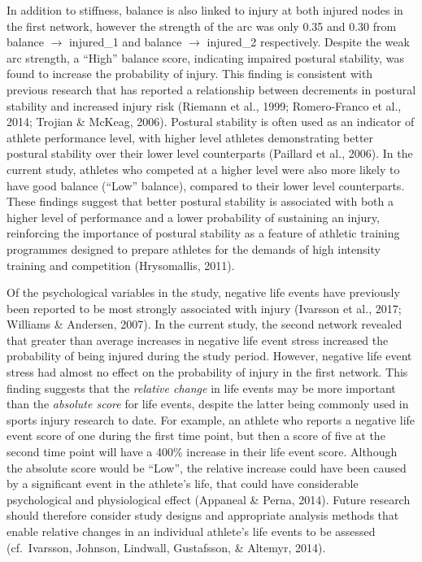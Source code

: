 \documentclass[
  english,
  man,floatsintext]{apa6}
\begin{document}
In addition to stiffness, balance is also linked to injury at both injured nodes in the first network, however the strength of the arc was only 0.35 and 0.30 from balance \(\rightarrow\) injured\_1 and balance \(\rightarrow\) injured\_2 respectively.
Despite the weak arc strength, a \enquote{High} balance score, indicating impaired postural stability, was found to increase the probability of injury.
This finding is consistent with previous research that has reported a relationship between decrements in postural stability and increased injury risk (Riemann et al., 1999; Romero-Franco et al., 2014; Trojian \& McKeag, 2006).
Postural stability is often used as an indicator of athlete performance level, with higher level athletes demonstrating better postural stability over their lower level counterparts (Paillard et al., 2006).
In the current study, athletes who competed at a higher level were also more likely to have good balance (\enquote{Low} balance), compared to their lower level counterparts.
These findings suggest that better postural stability is associated with both a higher level of performance and a lower probability of sustaining an injury, reinforcing the importance of postural stability as a feature of athletic training programmes designed to prepare athletes for the demands of high intensity training and competition (Hrysomallis, 2011).

Of the psychological variables in the study, negative life events have previously been reported to be most strongly associated with injury (Ivarsson et al., 2017; Williams \& Andersen, 2007).
In the current study, the second network revealed that greater than average increases in negative life event stress increased the probability of being injured during the study period.
However, negative life event stress had almost no effect on the probability of injury in the first network.
This finding suggests that the \emph{relative change} in life events may be more important than the \emph{absolute score} for life events, despite the latter being commonly used in sports injury research to date.
For example, an athlete who reports a negative life event score of one during the first time point, but then a score of five at the second time point will have a 400\% increase in their life event score.
Although the absolute score would be \enquote{Low}, the relative increase could have been caused by a significant event in the athlete's life, that could have considerable psychological and physiological effect (Appaneal \& Perna, 2014).
Future research should therefore consider study designs and appropriate analysis methods that enable relative changes in an individual athlete's life events to be assessed (cf.~Ivarsson, Johnson, Lindwall, Gustafsson, \& Altemyr, 2014).
\end{document}
